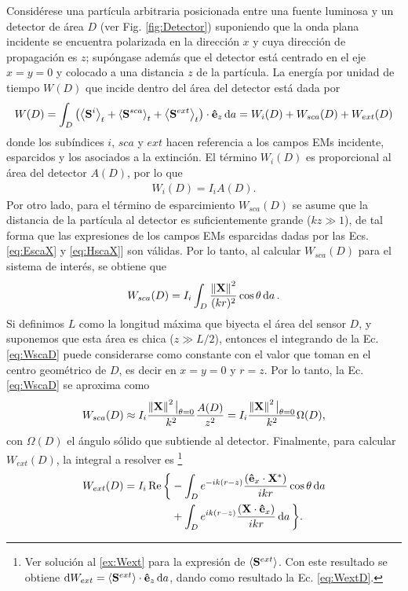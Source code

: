 Considérese una partícula arbitraria posicionada entre una fuente luminosa y un detector de área $D$ (ver Fig. \ref{fig:Detector}) suponiendo que la onda plana incidente se encuentra polarizada en la dirección $x$ y cuya dirección de propagación es $z$; supóngase además que el detector está centrado en el eje $x=y=0$ y colocado a una distancia $z$ de la partícula. La energía por unidad de tiempo $W(D)$ que incide dentro del área del detector está dada por
%
\begin{align}
W(D) = \int_D\qty(\ev{\vb{S}^i}_t+\ev{\vb{S}^{sca}}_t+\ev{\vb{S}^{ext}}_t)\cdot\vu{e}_z\dd{a} = W_i(D) + W_{sca}(D) + W_{ext}(D)
\end{align}
%
donde los subíndices $i,\, sca$ y $ext$ hacen referencia a los campos EMs incidente, esparcidos y los asociados a la extinción. El término $W_i(D)$ es proporcional al área del detector $A(D)$, por lo que
%
\begin{align}
W_i (D) = I_iA(D).
\label{eq:WiD}
\end{align}
%
Por otro lado, para el término de esparcimiento $W_{sca}(D)$ se asume que la distancia de la partícula al detector es suficientemente grande ($kz\gg 1$), de tal forma que las expresiones de los campos EMs esparcidas  dadas por las Ecs. \eqref{eq:EscaX} y \eqref{eq:HscaX}]  son válidas. Por lo tanto, al calcular $W_{sca}(D)$ para el sistema de interés, se obtiene que 
%
\begin{align}
W_{sca}(D)  = I_i \int_D\frac{\norm{\vb{X}}^2}{(kr)^2}\cos\theta\dd{a}.
\label{eq:WscaD}
\end{align}
% 
Si definimos $L$ como la longitud máxima que biyecta el área del sensor $D$, y suponemos que esta área es chica ($z \gg L/2$), entonces el integrando de la Ec.\eqref{eq:WscaD} puede considerarse como constante con el valor que toman en el centro geométrico de $D$, es decir en $x=y=0$ y $r = z$. Por lo tanto, la Ec. \eqref{eq:WscaD} se aproxima como
%
\begin{align}
W_{sca}(D)\approx I_i \frac{\norm{\vb{X}}^2\eval_{\theta = 0}}{k^2}\frac{A(D)}{z^2} = 
 	I_i\frac{\norm{\vb{X}}^2\eval_{\theta = 0}}{k^2}\Omega(D),
\label{eq:WscaFullD}
\end{align}
%
con $\Omega(D)$ el ángulo sólido que subtiende al detector. Finalmente, para calcular $W_{ext}(D)$, la integral a resolver es \footnote{Ver solución al \ref{ex:Wext} para la expresión de $\ev{\vb{S}^{ext}}$. Con este resultado se obtiene $\dd W_{ext} = \ev{\vb{S}^{ext}}\cdot\vu{e}_z\dd{a}$, dando como resultado la Ec. \eqref{eq:WextD}.}
%
\begin{align}
W_{ext}(D) =  I_i\Re\bigg\{&
	-\int_D e^{-ik(r-z)}\frac{(\vu{e}_x\cdot\vb{X}^*)}{ikr}\cos\theta\dd{a}\notag\\
&+
	\int_D e^{ik(r-z)} \frac{(\vb{X}\cdot\vu{e}_x)}{ikr}\dd{a}
\bigg\}.
\label{eq:WextD}
\end{align}
